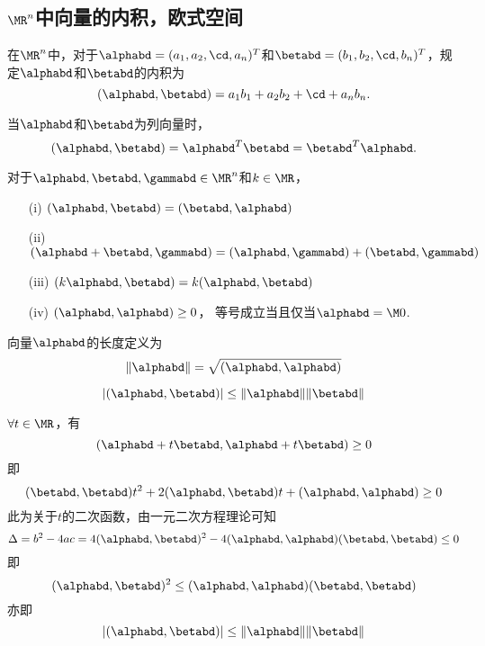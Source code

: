 \subsection{$\MR^n$中向量的内积，欧式空间}

\begin{frame}  
  \begin{dingyi}
    在$\MR^n$中，对于$\alphabd=(a_1,a_2,\cd,a_n)^T$和$\betabd=(b_1,b_2,\cd,b_n)^T$，规定$\alphabd$和$\betabd$的内积为
    $$
    (\alphabd,\betabd)=a_1b_1+a_2b_2+\cd+a_nb_n.
    $$
  \end{dingyi}
  当$\alphabd$和$\betabd$为列向量时，
  $$
  (\alphabd,\betabd)=\alphabd^T\betabd=\betabd^T\alphabd.
  $$
  
\end{frame}

\begin{frame}
  
  \begin{xingzhi}[内积的运算性质]
    对于$\alphabd,\betabd,\gammabd\in\MR^n$和$k\in\MR$，
    \begin{itemize}
    \item[(i)]   $(\alphabd,\betabd)=(\betabd,\alphabd)$
    \item[(ii)]  $(\alphabd+\betabd,\gammabd)=(\alphabd,\gammabd)+(\betabd,\gammabd)$
    \item[(iii)] $(k\alphabd,\betabd)=k(\alphabd,\betabd)$
    \item[(iv)]  $(\alphabd,\alphabd)\ge0$， 等号成立当且仅当$\alphabd=\M0$.
    \end{itemize}
  \end{xingzhi}
  \pause
  \begin{dingyi}[向量长度]
    向量$\alphabd$的长度定义为
    $$
    \|\alphabd\|=\sqrt{(\alphabd,\alphabd)}
    $$
  \end{dingyi}
  
\end{frame}


\begin{frame}
  
  \begin{dingli}
    $$
    |(\alphabd,\betabd)|\le\|\alphabd\|\|\betabd\|
    $$
  \end{dingli}
  \pause 
  \proofname
  $\forall t \in \MR$，有
  $$
  (\alphabd+t\betabd,\alphabd+t\betabd) \ge 0
  $$
  即
  $$
  (\betabd,\betabd)t^2+2(\alphabd,\betabd)t+(\alphabd,\alphabd)\ge0
  $$
  此为关于$t$的二次函数，由一元二次方程理论可知
  $$
  \Delta = b^2-4ac = 4 (\alphabd,\betabd)^2-4(\alphabd,\alphabd)(\betabd,\betabd)\le 0
  $$
  即
  $$
  (\alphabd,\betabd)^2\le (\alphabd,\alphabd)(\betabd,\betabd)
  $$
  亦即
  $$
  |(\alphabd,\betabd)|\le\|\alphabd\|\|\betabd\|
  $$
  
\end{frame}

